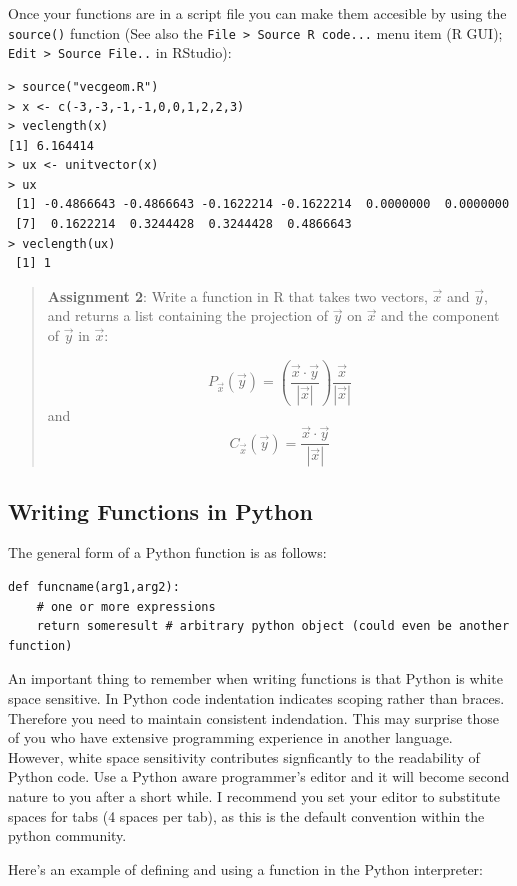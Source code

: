 \documentclass{article}
\begin{document}
Once your functions are in a script file you can make them accesible by
using the \lstinline!source()! function (See also the
\lstinline!File > Source R code...! menu item (R GUI);
\lstinline!Edit > Source File..! in RStudio):

\begin{lstlisting}
> source("vecgeom.R")
> x <- c(-3,-3,-1,-1,0,0,1,2,2,3)
> veclength(x)
[1] 6.164414
> ux <- unitvector(x)
> ux
 [1] -0.4866643 -0.4866643 -0.1622214 -0.1622214  0.0000000  0.0000000
 [7]  0.1622214  0.3244428  0.3244428  0.4866643
> veclength(ux)
 [1] 1
\end{lstlisting}
\begin{quote}
\textbf{Assignment 2}: Write a function in R that takes two vectors,
$\vec{x}$ and $\vec{y}$, and returns a list containing the projection of
$\vec{y}$ on $\vec{x}$ and the component of $\vec{y}$ in $\vec{x}$:

\[P_{\vec{x}}(\vec{y}) = \left(\frac{\vec{x} \cdot \vec{y}}{|\vec{x}|}\right) \frac{\vec{x}}{|\vec{x}|}\]
and \[C_{\vec{x}}(\vec{y}) = \frac{\vec{x} \cdot \vec{y}}{|\vec{x}|}\]

\end{quote}
\subsection{Writing Functions in Python}

The general form of a Python function is as follows:

\begin{lstlisting}
def funcname(arg1,arg2):
    # one or more expressions
    return someresult # arbitrary python object (could even be another function)
\end{lstlisting}
An important thing to remember when writing functions is that Python is
white space sensitive. In Python code indentation indicates scoping
rather than braces. Therefore you need to maintain consistent
indendation. This may surprise those of you who have extensive
programming experience in another language. However, white space
sensitivity contributes signficantly to the readability of Python code.
Use a Python aware programmer's editor and it will become second nature
to you after a short while. I recommend you set your editor to
substitute spaces for tabs (4 spaces per tab), as this is the default
convention within the python community.

Here's an example of defining and using a function in the Python
interpreter:
\end{document}
